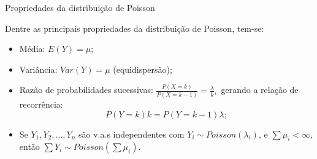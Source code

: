 \documentclass[10pt, aspectratio=169]{beamer}\usepackage[]{graphicx}\usepackage[]{color}
\begin{document}
\begin{frame}{Propriedades da distribuição de Poisson}

Dentre as principais propriedades da distribuição de Poisson, tem-se:
\vspace{0,3cm}
\begin{itemize}

    \item Média: $E(Y)= \mu$;
    \vspace{0,5cm}
    \item Variância: $Var(Y)=\mu$ (equidispersão);
    \vspace{0,5cm}
    \item Razão de probabilidades sucessivas: 
    $\frac{P\left ( X=k \right )}{P\left ( X=k-1 \right )}=\frac{\lambda}{k},$ 
    gerando a relação de recorrência:
    $$
        P(Y=k)k=P(Y=k-1)\lambda;
    $$
    \item Se $Y_{1},Y_{2},...,Y_{n}$ são v.a.s independentes com 
    $Y_{i}\sim Poisson(\lambda_{i})$, e $\sum\mu_{i}<\infty$, então 
    $\sum Y_{i}\sim Poisson(\sum\mu_{i})$.
    \end{itemize}
\end{frame}

\end{document}
